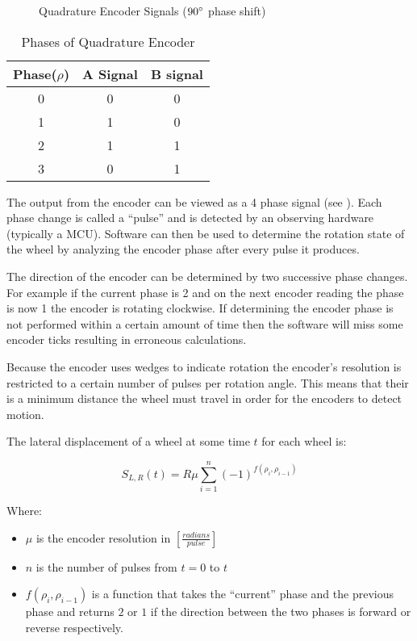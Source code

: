 \documentclass[main.tex]{subfiles}
\begin{document}
\begin{figure}[h]
	\begin{center}
	
	\end{center}
	\caption{Quadrature Encoder Signals ($90^\circ$ phase shift)}
	\label{fig:encSig}
\end{figure}

\begin{table}[h]
	\begin{center}
	\begin{tabularx}{.35\textwidth}{ccc}
		\toprule
		Phase($\rho$) & A Signal & B signal\\
		\midrule
		0 & 0 & 0 \\
		1 & 1 & 0 \\
		2 & 1 & 1 \\
		3 & 0 & 1 \\
		\bottomrule
		\end{tabularx}
		\caption{Phases of Quadrature Encoder}
		\label{tab:phaseTab}
	\end{center}
\end{table}

The output from the encoder can be viewed as a 4 phase signal (see
). Each phase change is called a ``pulse'' and is detected by
an observing hardware (typically a MCU). Software can then be used to determine
the rotation state of the wheel by analyzing the encoder phase after every pulse
it produces.

The direction of the encoder can be determined by two successive phase changes.
For example if the current phase is 2 and on the next encoder reading the phase
is now 1 the encoder is rotating clockwise. If determining the encoder phase is
not performed within a certain amount of time then the software will miss some
encoder ticks resulting in erroneous calculations. 

Because the encoder uses wedges to indicate rotation the encoder's resolution is
restricted to a certain number of pulses per rotation angle. This means that
their is a minimum distance the wheel must travel in order for the encoders to
detect motion.

The lateral displacement of a wheel at some time $t$ for each wheel is: 

\begin{equation}
\label{eq:encTransDist}
S_{L,R}(t) = R\mu\sum_{i=1}^n{(-1)^{f(\rho_i,\rho_{i-1})}}
\end{equation}

Where: 
\begin{itemize}
\item $\mu$ is the encoder resolution in $[\frac{radians}{pulse}]$
\item $n$ is the number of pulses from $t=0$ to $t$
\item $f(\rho_i,\rho_{i-1})$ is a function that takes the ``current'' phase and
the previous phase and returns $2$ or $1$ if the direction between the two
phases is forward or reverse respectively.
\end{itemize}
\end{document}
